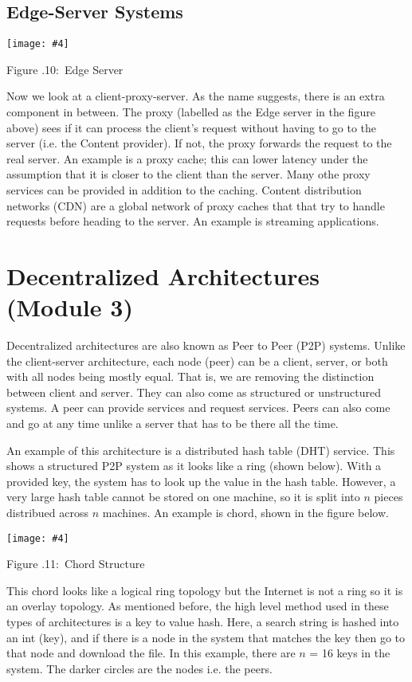 \documentclass[twoside]{article}
\newcounter{lecnum}
\newcommand{\fig}[4]{
            \centerline{\texttt{[image: \#4]}}
            \begin{center}
            Figure \thelecnum.#1:~#3
            \end{center}
    }
\begin{document}
\subsection{Edge-Server Systems}
\fig{10}{0.5}{Edge Server}{edgeServer.png}

Now we look at a client-proxy-server. As the name suggests, there is an extra component in between. The proxy (labelled as the Edge server in the figure above) sees if it can process the client's request without having to go to the server (i.e. the Content provider). If not, the proxy forwards the request to the real server. An example is a proxy cache; this can lower latency under the assumption that it is closer to the client than the server. Many othe proxy services can be provided in addition to the caching. Content distribution networks (CDN) are a global network of proxy caches that that try to handle requests before heading to the server. An example is streaming applications.











\section{Decentralized Architectures (Module 3)}

Decentralized architectures are also known as Peer to Peer (P2P) systems. Unlike the client-server architecture, each node (peer) can be a client, server, or both with all nodes being mostly equal. That is, we are removing the distinction between client and server. They can also come as structured or unstructured systems. A peer can provide services and request services. Peers can also come and go at any time unlike a server that has to be there all the time.

An example of this architecture is a distributed hash table (DHT) service. This shows a structured P2P system as it looks like a ring (shown below). With a provided key, the system has to look up the value in the hash table. However, a very large hash table cannot be stored on one machine, so it is split into $n$ pieces distribued across $n$ machines. An example is chord, shown in the figure below.

\fig{11}{0.5}{Chord Structure}{chord.png}

This chord looks like a logical ring topology but the Internet is not a ring so it is an overlay topology. As mentioned before, the high level method used in these types of architectures is a key to value hash. Here, a search string is hashed into an int (key), and if there is a node in the system that matches the key then go to that node and download the file.  In this example, there are $n$ = 16 keys in the system. The darker circles are the nodes i.e. the peers. 
\end{document}

